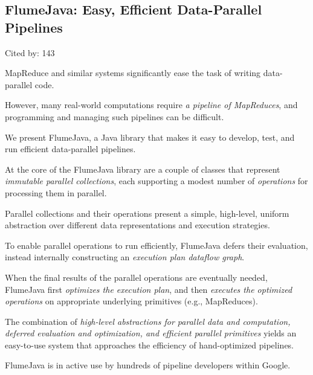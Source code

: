 \documentclass[a4paper,11pt]{article}
\begin{document}
\subsection*{FlumeJava: Easy, Efficient Data-Parallel Pipelines}
{\color{cyan} {\color{magenta} Cited by: 143}

MapReduce and similar systems significantly ease the task of writing data-parallel code. 

However, 
many real-world computations require {\color{red} \em a pipeline of MapReduces}, and 
programming and managing such pipelines can be difficult. 

We present 
{\color{black} FlumeJava\cite{flumejava}}, 
a Java library that makes it easy to develop, test, and run efficient data-parallel pipelines. 

At the core of the FlumeJava library are 
a couple of classes that represent 
{\color{red} \em immutable parallel collections}, 
each supporting a modest number of {\color{red} \em operations} 
for processing them in parallel. 

Parallel collections and their operations present a 
simple, high-level, uniform abstraction 
over different data representations and execution strategies. 

To enable parallel operations to run efficiently,
FlumeJava defers their evaluation, 
instead internally constructing an 
{\color{red} \em execution plan dataflow graph}. 

When the final results of the parallel operations are eventually needed, 
FlumeJava 
first {\color{red} \em optimizes the execution plan}, and 
then {\color{red} \em executes the optimized operations} on appropriate underlying primitives (e.g., MapReduces). 

The combination of 
{\color{red} \em high-level abstractions for parallel data and computation,
deferred evaluation and optimization, and 
efficient parallel primitives}
yields an easy-to-use system that approaches the efficiency of hand-optimized pipelines. 

FlumeJava is in active use by hundreds of pipeline developers within Google.

}
\end{document}
